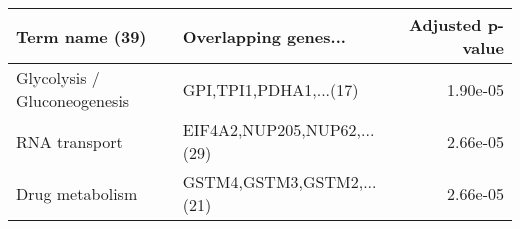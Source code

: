 \begin{tabular}{llr}
\toprule
              Term name (39) &        Overlapping genes... &  Adjusted p-value \\
\midrule
Glycolysis / Gluconeogenesis &      GPI,TPI1,PDHA1,...(17) &          1.90e-05 \\
               RNA transport & EIF4A2,NUP205,NUP62,...(29) &          2.66e-05 \\
             Drug metabolism &   GSTM4,GSTM3,GSTM2,...(21) &          2.66e-05 \\
\bottomrule
\end{tabular}
